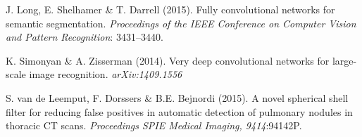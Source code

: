 \documentclass{article}
\begin{document}


\begin{thebibliography}{}
J. Long, E. Shelhamer \& T. Darrell (2015). Fully convolutional networks for semantic segmentation. \emph{Proceedings of the IEEE Conference on Computer Vision and Pattern Recognition}: 3431--3440.

K. Simonyan \& A. Zisserman (2014). Very deep convolutional networks for large-scale image recognition. \emph{arXiv:1409.1556}

S. van de Leemput, F. Dorssers \& B.E. Bejnordi (2015). A novel spherical shell filter for reducing false positives in automatic detection of pulmonary nodules in thoracic CT scans. \emph{Proceedings SPIE Medical Imaging, 9414}:94142P.

\end{thebibliography}
\end{document}
